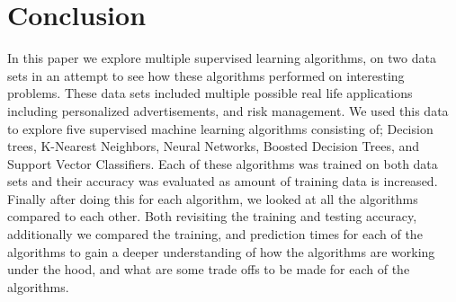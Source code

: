 \documentclass[
	letterpaper, %
]{IEEEtran}
\begin{document}
	\section{Conclusion}
	In this paper we explore multiple supervised learning algorithms, on two data sets in an attempt to see how these algorithms performed on interesting problems. These data sets included multiple possible real life applications including personalized advertisements, and risk management. We used this data to explore five supervised machine learning algorithms consisting of; Decision trees, K-Nearest Neighbors, Neural Networks, Boosted Decision Trees, and Support Vector Classifiers. Each of these algorithms was trained on both data sets and their accuracy was evaluated as amount of training data is increased. Finally after doing this for each algorithm, we looked at all the algorithms compared to each other. Both revisiting the training and testing accuracy, additionally we compared the training, and prediction times for each of the algorithms to gain a deeper understanding of how the algorithms are working under the hood, and what are some trade offs to be made for each of the algorithms.
	
	\nocite{*}
	\printbibliography[
	heading=bibintoc,
	title={References}
	] %
\end{document}
